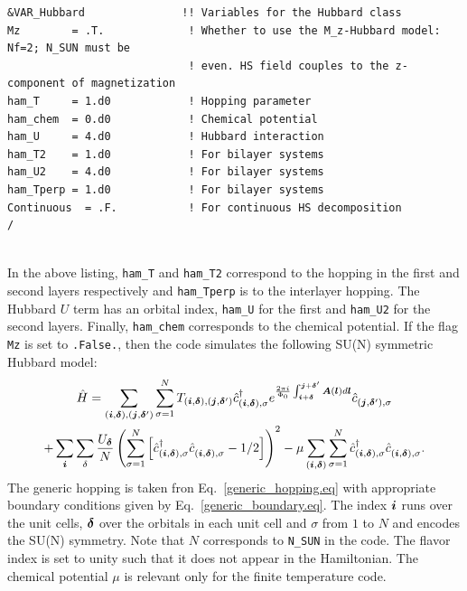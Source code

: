 \begin{lstlisting}[style=fortran,escapechar=\#,breaklines=true]
&VAR_Hubbard               !! Variables for the Hubbard class
Mz        = .T.             ! Whether to use the M_z-Hubbard model: Nf=2; N_SUN must be  
                            ! even. HS field couples to the z-component of magnetization
ham_T     = 1.d0            ! Hopping parameter
ham_chem  = 0.d0            ! Chemical potential
ham_U     = 4.d0            ! Hubbard interaction
ham_T2    = 1.d0            ! For bilayer systems
ham_U2    = 4.d0            ! For bilayer systems
ham_Tperp = 1.d0            ! For bilayer systems
Continuous  = .F.           ! For continuous HS decomposition
/
               
\end{lstlisting}
In the above listing, \texttt{ham\_T} and \texttt{ham\_T2} correspond to the hopping in the first and second layers respectively and  \texttt{ham\_Tperp} is to the interlayer hopping.   The Hubbard $U$ term has an orbital index, \texttt{ham\_U}  for the first and \texttt{ham\_U2} for the second layers.  Finally,  \texttt{ham\_chem}  corresponds to the chemical potential.    If the flag \texttt{Mz} is set to \texttt{.False.}, then the code simulates the following SU(N) symmetric Hubbard model:
\begin{multline}
\hat{H} = \sum_{(\ve{i},\ve{\delta}), (\ve{j},\ve{\delta}')}  \sum_{\sigma =1}^{N}  T_{(\ve{i},\ve{\delta}), (\ve{j},\ve{\delta}')}    \hat{c}^{\dagger}_{(\ve{i},\ve{\delta}), \sigma }   e^{\frac{2 \pi i}{\Phi_0} \int_{\ve{i} + \ve{\delta}}^{\ve{j} + \ve{\delta}'}  
     \vec{A}(\ve{l})  d \ve{l}} \hat{c}^{}_{(\ve{j},\ve{\delta}'),\sigma} \\
 + \sum_{\vec{i}} \sum_{\delta}   \frac{U_{\ve{\delta}} }{N} \left(\sum_{\sigma=1}^{N}  \left[   \hat{c}^{\dagger}_{(\vec{i},\ve{\delta}),\sigma } 
    \hat{c}^{\phantom\dagger}_{(\vec{i}, \ve{\delta}),\sigma }  - 1/2  \right] \right)^2
    - \mu \sum_{(\ve{i},\ve{\delta})}  \sum_{\sigma =1}^{N} \hat{c}^{\dagger}_{(\vec{i},\ve{\delta}),\sigma } \hat{c}^{\phantom\dagger}_{(\vec{i},\ve{\delta}),\sigma } .
\end{multline}
The  generic hopping is taken fron Eq.~\eqref{generic_hopping.eq}   with appropriate boundary conditions given by Eq.~\eqref{generic_boundary.eq}.  The index $\boldsymbol{i}$ runs over the unit cells, $\boldsymbol{\delta}$ over the orbitals in each unit cell and $\sigma$  from $1$ to $N$  and encodes the SU(N) symmetry.    Note that  $N$ corresponds to \texttt{N\_SUN}  in the code.  The flavor index is set to  unity such that it does not appear in the  Hamiltonian. The chemical potential $\mu$ is relevant only for the finite temperature code. 

